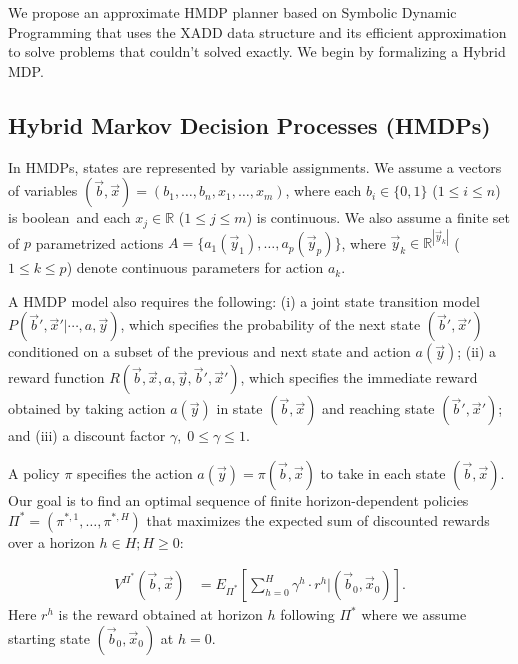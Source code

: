 \label{sec:basdp}
We propose an approximate HMDP planner based on Symbolic Dynamic Programming that uses the XADD data structure and its efficient approximation to solve problems that couldn't solved exactly. We begin by formalizing a Hybrid MDP.

\subsection{Hybrid Markov Decision Processes (HMDPs) }
In HMDPs, states are represented by variable assignments. We assume a vectors of variables
$(\vec{b},\vec{x}) = ( b_1,\ldots,b_n,x_{1},\ldots,x_m )$, where each $b_i \in \{ 0,1 \}$ ($1 \leq i \leq n$) is boolean$\,$ and each $x_j \in \mathbb{R}$ ($1 \leq j \leq m$) is continuous. We also assume a finite set of $p$ parametrized actions $A = \{ a_1(\vec{y}_1), \ldots, a_p(\vec{y}_p) \}$, where $\vec{y}_k \in \mathbb{R}^{|\vec{y}_k|}$ ($1 \leq k \leq p$) denote continuous parameters for action $a_k$.

A HMDP model also requires the following: (i) a joint state transition model
$P(\vec{b}',\vec{x}'|\cdots,a,\vec{y})$, which specifies the
probability of the next state $(\vec{b}',\vec{x}')$ conditioned on a
subset of the previous and next state and action $a(\vec{y})$; (ii) a
reward function $R(\vec{b},\vec{x},a,\vec{y},\vec{b}',\vec{x}')$, which specifies the
immediate reward obtained by taking action $a(\vec{y})$ in state
$(\vec{b},\vec{x})$ and reaching state $(\vec{b}',\vec{x}')$; and (iii) a discount factor $\gamma, \; 0 \leq \gamma \leq 1$.

A policy $\pi$ specifies the action $a(\vec{y}) =
\pi(\vec{b},\vec{x})$ to take in each state $(\vec{b},\vec{x})$.  Our
goal is to find an optimal sequence of finite horizon-dependent
policies $\Pi^* = (\pi^{*,1},\ldots,\pi^{*,H})$ that
maximizes the expected sum of discounted rewards over a horizon $h \in
H; H \geq 0$:

\begin{align}
V^{\Pi^*}(\vec{b},\vec{x}) & = E_{\Pi^*} \left[ \sum_{h=0}^{H} \gamma^h \cdot r^h \Big| (\vec{b}_0,\vec{x}_0) \right]. \label{eq:vfun_def}
\end{align}
Here $r^h$ is the reward obtained at horizon $h$ following $\Pi^*$ where 
we assume starting state $(\vec{b}_0,\vec{x}_0)$ at $h=0$.
 
